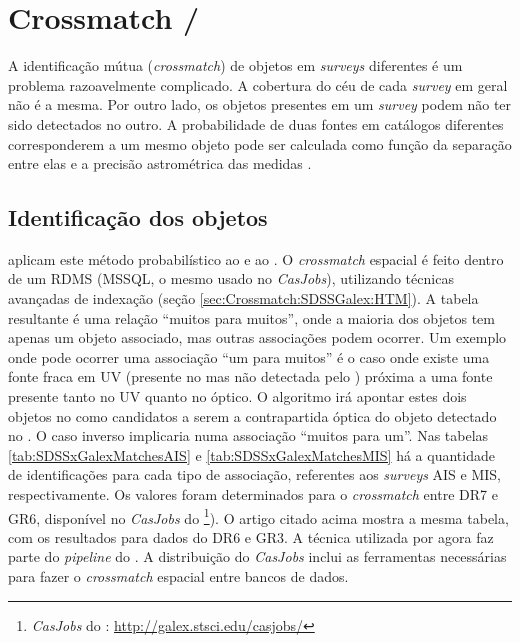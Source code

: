 
\section{Crossmatch \SDSS/\galex}

A identificação mútua ({\em crossmatch}) de objetos em {\em surveys} diferentes
é um problema razoavelmente complicado. A cobertura do céu de cada {\em survey}
em geral não é a mesma. Por outro lado, os objetos presentes em um {\em survey}
podem não ter sido detectados no outro. A probabilidade de duas fontes em
catálogos diferentes corresponderem a um mesmo objeto pode ser calculada como
função da separação entre elas e a precisão astrométrica das medidas
\citep{Budavari2008}.

\subsection{Identificação dos objetos}
\label{sec:Crossmatch:SDSSGalex:Identificacao}

\citet{Budavari2009} aplicam este método probabilístico ao \SDSS e ao \galex. O
{\em crossmatch} espacial é feito dentro de um RDMS (MSSQL, o mesmo usado no
{\em CasJobs}), utilizando técnicas avançadas de indexação (seção
\ref{sec:Crossmatch:SDSSGalex:HTM}). A tabela resultante é uma relação ``muitos
para muitos'', onde a maioria dos objetos \galex tem apenas um objeto \SDSS
associado, mas outras associações podem ocorrer. Um exemplo onde pode ocorrer
uma associação ``um para muitos'' é o caso onde existe uma fonte fraca em UV
(presente no \SDSS mas não detectada pelo \galex) próxima a uma fonte presente
tanto no UV quanto no óptico. O algoritmo irá apontar estes dois objetos no
\SDSS como candidatos a serem a contrapartida óptica do objeto detectado no
\galex. O caso inverso implicaria numa associação ``muitos para um''. Nas
tabelas \ref{tab:SDSSxGalexMatchesAIS} e \ref{tab:SDSSxGalexMatchesMIS} há a
quantidade de identificações para cada tipo de associação, referentes aos {\em
surveys} AIS e MIS, respectivamente. Os valores foram determinados para o {\em
crossmatch} entre \SDSS DR7 e \galex GR6, disponível no {\em CasJobs} do
\galex\footnote{{\em CasJobs} do \galex:
\url{http://galex.stsci.edu/casjobs/}}). O artigo citado acima mostra a mesma
tabela, com os resultados para dados do \SDSS DR6 e \galex GR3. A técnica
utilizada por \citeauthor{Budavari2009} agora faz parte do {\em pipeline} do
\galex. A distribuição do {\em CasJobs} inclui as ferramentas necessárias para
fazer o {\em crossmatch} espacial entre bancos de dados.


